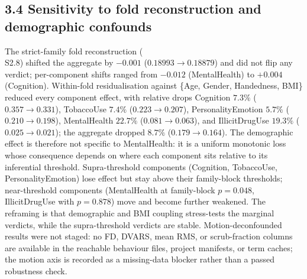 \documentclass[11pt,letterpaper]{report}
\begin{document}
\subsection*{3.4 Sensitivity to fold reconstruction and demographic confounds}

The strict-family fold reconstruction (\\S2.8) shifted the aggregate by $-0.001$ ($0.18993 \rightarrow 0.18879$) and did not flip any verdict; per-component shifts ranged from $-0.012$ (MentalHealth) to $+0.004$ (Cognition). Within-fold residualisation against \{Age, Gender, Handedness, BMI\} reduced every component effect, with relative drops Cognition $7.3\%$ ($0.357 \rightarrow 0.331$), TobaccoUse $7.4\%$ ($0.223 \rightarrow 0.207$), PersonalityEmotion $5.7\%$ ($0.210 \rightarrow 0.198$), MentalHealth $22.7\%$ ($0.081 \rightarrow 0.063$), and IllicitDrugUse $19.3\%$ ($0.025 \rightarrow 0.021$); the aggregate dropped $8.7\%$ ($0.179 \rightarrow 0.164$). The demographic effect is therefore not specific to MentalHealth: it is a uniform monotonic loss whose consequence depends on where each component sits relative to its inferential threshold. Supra-threshold components (Cognition, TobaccoUse, PersonalityEmotion) lose effect but stay above their family-block thresholds; near-threshold components (MentalHealth at family-block $p = 0.048$, IllicitDrugUse with $p = 0.878$) move and become further weakened. The reframing is that demographic and BMI coupling stress-tests the marginal verdicts, while the supra-threshold verdicts are stable. Motion-deconfounded results were not staged: no FD, DVARS, mean RMS, or scrub-fraction columns are available in the reachable behaviour files, project manifests, or term caches; the motion axis is recorded as a missing-data blocker rather than a passed robustness check.
\end{document}
